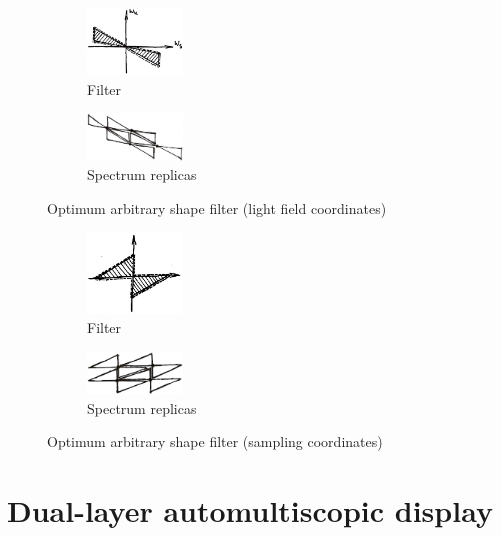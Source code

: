 \documentclass[acmtog,review,anonymous]{acmart}
\begin{document}
\begin{figure}[h]
  \centering
  \begin{subfigure}[t]{1in}
    \centering
    \includegraphics[width=1in]{figures/fanfilter}
    \caption{Filter}\label{fig:fanfilter}
  \end{subfigure}
  \quad
  \begin{subfigure}[t]{1in}
    \centering
    \includegraphics[width=1in]{figures/fanrep}
    \caption{Spectrum replicas}\label{fig:fanrep}
  \end{subfigure}
  \caption{Optimum arbitrary shape filter (light field coordinates)}\label{fig:fan}
\end{figure}

\begin{figure}[h]
  \centering
  \begin{subfigure}[t]{1in}
    \centering
    \includegraphics[width=1in]{figures/fanfilter2}
    \caption{Filter}\label{fig:fanfilter2}
  \end{subfigure}
  \quad
  \begin{subfigure}[t]{1in}
    \centering
    \includegraphics[width=1in]{figures/fanrep2}
    \caption{Spectrum replicas}\label{fig:fanrep2}
  \end{subfigure}
  \caption{Optimum arbitrary shape filter (sampling coordinates)}\label{fig:fan2}
\end{figure}

\section{Dual-layer automultiscopic display}

\cite{Lanman:2010:CPB:1882261.1866164}
\end{document}
